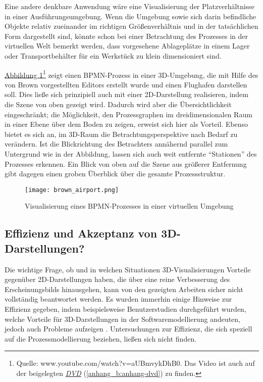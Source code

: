 \documentclass[a4paper,10pt]{sphinxmanual}
\begin{document}
Eine andere denkbare Anwendung wäre eine Visualisierung der Platzverhältnisse in einer Ausführungsumgebung.
Wenn die Umgebung sowie sich darin befindliche Objekte relativ zueinander im richtigen Größenverhältnis und in der tatsächlichen Form dargestellt sind, könnte schon bei einer Betrachtung des Prozesses in der virtuellen Welt bemerkt werden, dass vorgesehene Ablageplätze in einem Lager oder Transportbehälter für ein Werkstück zu klein dimensioniert sind.

\hyperref[related:brown-airport]{Abbildung  \ref*{related:brown-airport}}\footnote{
Quelle: www.youtube.com/watch?v=aUBmvykDhB0. Das Video ist auch auf der beigelegten {\hyperref[anhang_b:anhang-dvd]{\emph{DVD}}} (\autoref*{anhang_b:anhang-dvd}) zu finden.
} zeigt einen BPMN-Prozess in einer 3D-Umgebung, die mit Hilfe des von Brown vorgestellten Editors erstellt wurde und einen Flughafen darstellen soll.
Dies ließe sich prinzipiell auch mit einer 2D-Darstellung realisieren, indem die Szene von oben gezeigt wird.
Dadurch wird aber die Übersichtlichkeit eingeschränkt; die Möglichkeit, den Prozessgraphen im dreidimensionalen Raum in einer Ebene über dem Boden zu zeigen, erweist sich hier als Vorteil.
Ebenso bietet es sich an, im 3D-Raum die Betrachtungsperspektive nach Bedarf zu verändern.
Ist die Blickrichtung des Betrachters annähernd parallel zum Untergrund wie in der Abbildung, lassen sich auch weit entfernte "`Stationen"' des Prozesses erkennen.
Ein Blick von oben auf die Szene aus größerer Entfernung gibt dagegen einen groben Überblick über die gesamte Prozessstruktur.
\begin{figure}[htbp]
\centering
\capstart

\texttt{[image: brown\_airport.png]}
\caption{Visualisierung eines BPMN-Prozesses in einer virtuellen Umgebung}\label{related:brown-airport}\end{figure}


\subsection{Effizienz und Akzeptanz von 3D-Darstellungen?}
\label{related:effizienz-und-akzeptanz-von-3d-darstellungen}
Die wichtige Frage, ob und in welchen Situationen 3D-Visualisierungen Vorteile gegenüber 2D-Darstellungen haben, die über eine reine Verbesserung des Erscheinungsbilds hinausgehen,  kann von den gezeigten Arbeiten sicher nicht vollständig beantwortet werden.
Es wurden immerhin einige Hinweise zur Effizienz gegeben, indem beispielsweise Benutzerstudien durchgeführt wurden, welche Vorteile für 3D-Darstellungen in der Softwaremodellierung andeuten, jedoch auch Probleme aufzeigen \cite{dwyer_three_2001} \cite{mcintosh_x3d-uml:_2008} \cite{halpin_exploring_2008}.
Untersuchungen zur Effizienz, die sich speziell auf die Prozessmodellierung beziehen, ließen sich nicht finden.
\end{document}
